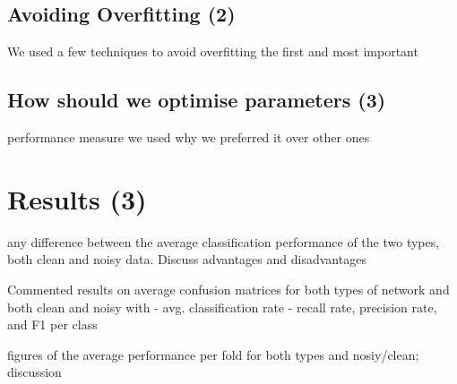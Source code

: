 \documentclass[10pt,a4paper]{article}
\begin{document}
\subsection{Avoiding Overfitting (2)}
We used a few techniques to avoid overfitting the first and most important 

\subsection{How should we optimise parameters (3)}
performance measure we used why we preferred it over other ones

\section{Results (3)}

any difference between the average classification performance of the two types, both clean and noisy data. Discuss advantages and disadvantages

Commented results on average confusion matrices for both types of network and both clean and noisy with 
	- avg. classification rate
	- recall rate, precision rate, and F1 per class

figures of the average performance per fold for both types and nosiy/clean; discussion
\end{document}
